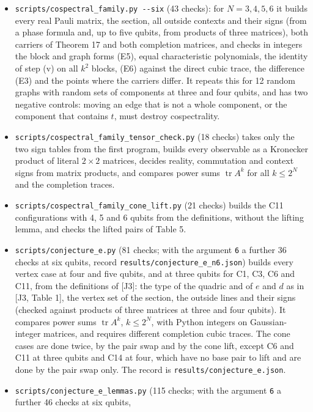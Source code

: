\documentclass[11pt,a4paper]{article}
\providecommand{\tightlist}{\setlength{\itemsep}{0pt}\setlength{\parskip}{0pt}}
\begin{document}
\begin{itemize}
\tightlist
\item
  \texttt{scripts/cospectral\_family.py\ -\/-six} (43 checks): for \(N=3,4,5,6\) it builds every real Pauli matrix,
  the section, all outside contexts and their signs (from a phase formula and, up to five qubits, from
  products of three matrices), both carriers of Theorem 17 and both completion matrices, and checks in
  integers the block and graph forms (E5), equal characteristic polynomials, the identity of step (v)
  on all \(k^2\) blocks, (E6) against the direct cubic trace, the difference (E3) and the points where the
  carriers differ. It repeats this for 12 random graphs with random sets of components at three and
  four qubits, and has two negative controls: moving an edge that is not a whole component, or the
  component that contains \(t\), must destroy cospectrality.
\item
  \nolinkurl{scripts/cospectral_family_tensor_check.py} (18 checks) takes only the two sign tables from the first
  program, builds every observable as a Kronecker product of literal \(2\times2\) matrices, decides
  reality, commutation and context signs from matrix products, and compares power sums
  \(\operatorname{tr}A^k\) for all \(k\le2^N\) and the completion traces.
\item
  \nolinkurl{scripts/cospectral_family_cone_lift.py} (21 checks) builds the C11 configurations with 4, 5 and 6
  qubits from the definitions, without the lifting lemma, and checks the lifted pairs of Table 5.
\item
  \nolinkurl{scripts/conjecture_e.py} (81 checks; with the argument \texttt{6} a further 36 checks at six qubits, record
  \nolinkurl{results/conjecture_e_n6.json}) builds every vertex case at four and five qubits, and at three
  qubits for C1, C3, C6 and C11, from the definitions of {[}J3{]}: the type of the quadric and of \(e\) and \(d\)
  as in {[}J3, Table 1{]}, the vertex set of the section, the outside lines and their signs (checked against
  products of three matrices at three and four qubits). It compares power sums \(\operatorname{tr}A^k\), \(k\le2^N\), with
  Python integers on Gaussian-integer matrices, and requires different completion cubic traces. The cone
  cases are done twice, by the pair swap and by the cone lift, except C6 and C11 at three qubits and C14
  at four, which have no base pair to lift and are done by the pair swap only. The record is
  \nolinkurl{results/conjecture_e.json}.
\item
  \nolinkurl{scripts/conjecture_e_lemmas.py} (115 checks; with the argument \texttt{6} a further 46 checks at six qubits,

\end{itemize}
\end{document}
